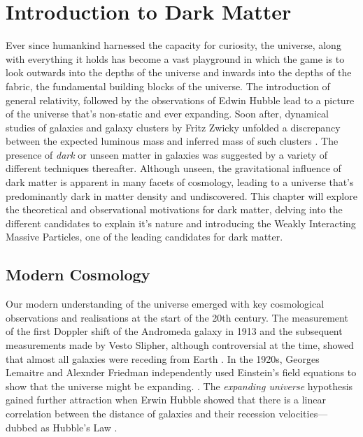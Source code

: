 \chapter{Introduction to Dark Matter}
\label{chap:chap1}


Ever since humankind harnessed the capacity for curiosity, the universe, along with everything it holds has become a vast playground in which the game is to look outwards into the depths of the universe and inwards into the depths of the fabric, the fundamental building blocks of the universe. The introduction of general relativity, followed by the observations of Edwin Hubble lead to a picture of the universe that's non-static and ever expanding. Soon after, dynamical studies of galaxies and galaxy clusters by Fritz Zwicky unfolded a discrepancy between the expected luminous mass and inferred mass of such clusters \cite{Fritz_Zwicky_1993}. The presence of \textit{dark} or unseen matter in galaxies was suggested by a variety of different techniques thereafter. Although unseen, the gravitational influence of dark matter is apparent in many facets of cosmology, leading to a universe that's predominantly dark in matter density and undiscovered. This chapter will explore the theoretical and observational motivations for dark matter, delving into the different candidates to explain it's nature and introducing the Weakly Interacting Massive Particles, one of the leading candidates for dark matter. 

\section{Modern Cosmology}
\label{sec:moderncosmology}

Our modern understanding of the universe emerged with key cosmological observations and realisations at the start of the 20th century. The measurement of the first Doppler shift of the Andromeda galaxy in 1913 and the subsequent measurements made by Vesto Slipher, although controversial at the time, showed that almost all galaxies were receding from Earth \cite{Slipler}. In the 1920s, Georges Lemaitre and Alexnder Friedman independently used Einstein's field equations to show that the universe might be expanding. \cite{Friedman}. 
The \textit{expanding universe} hypothesis gained further attraction when Erwin Hubble showed that there is a linear correlation between the distance of galaxies and their recession velocities---dubbed as Hubble's Law \cite{Hubble}.


